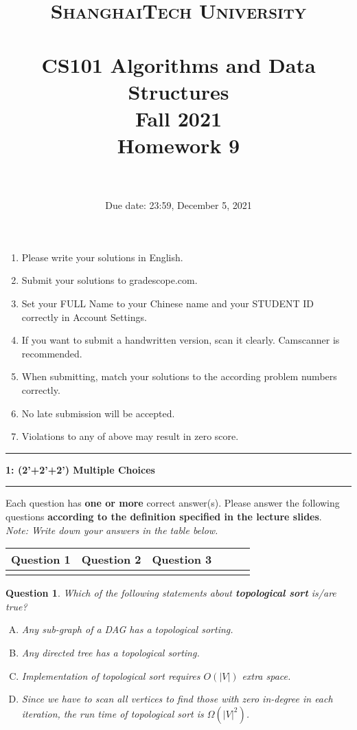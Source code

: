 \documentclass[10.5pt]{article}
\title{
	\normalfont \normalsize
	\textsc{ShanghaiTech University} \\ [25pt]
	\horrule{0.5pt} \\[0.4cm] %
	\huge CS101 Algorithms and Data Structures\\ %
	\LARGE Fall 2021\\
	\LARGE Homework 9\\
	\horrule{2pt} \\[0.5cm] %
}
\author{}
\date{Due date: 23:59, December 5, 2021}
\newcommand\question[2]{\vspace{.25in}\hrule\textbf{#1: #2}\vspace{.5em}\hrule\vspace{.10in}}
\newtheorem{Q}{Question}
\begin{document}
	\maketitle
	\thispagestyle{firstpage}
	\vspace{3ex}
	
	\begin{enumerate}
		\item Please write your solutions in English. 
		
		\item Submit your solutions to gradescope.com.  
		
		\item Set your FULL Name to your Chinese name and your STUDENT ID correctly in Account Settings. 
		
		\item If you want to submit a handwritten version, scan it clearly. Camscanner is recommended. 
		
		\item When submitting, match your solutions to the according problem numbers correctly. 
		
		\item No late submission will be accepted.
		
		\item Violations to any of above may result in zero score. 
	\end{enumerate}
	
	\newpage
	


\question{1}{(2'+2'+2') Multiple Choices}
	Each question has \textbf{one or more} correct answer(s). Please answer the following questions \textbf{according to  the definition specified in the lecture slides}.\\

	\textit{Note: Write down your answers in the table below. }
	\begin{table}[htbp]
		\begin{tabular}{|p{2cm}|p{2cm}|p{2cm}|p{2cm}|p{2cm}|p{2cm}|}
			\hline 
			Question 1 & Question 2 & Question 3 \\
			\hline 
			& &  \\ 
			\hline 
		\end{tabular} 
	\end{table}

	\begin{Q}
		Which of the following statements about \textbf{topological sort} is/are true?
		\begin{enumerate}[(A)]
			\item Any sub-graph of a DAG has a topological sorting.
			\item Any directed tree has a topological sorting.
			\item Implementation of topological sort requires $O(|V|)$ extra space.
			\item Since we have to scan all vertices to find those with zero in-degree in each iteration, the run time of topological sort is $\Omega(|V|^2)$.
		\end{enumerate}
	\end{Q}
	\vspace{0.5cm}
\end{document}
